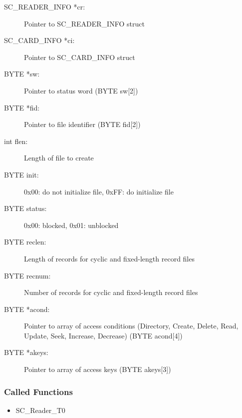 \documentclass[a4paper,oneside]{article}
\begin{document}
\begin{description}
\item[SC\_READER\_INFO *cr:] Pointer to SC\_READER\_INFO struct
\item[SC\_CARD\_INFO *ci:] Pointer to SC\_CARD\_INFO struct
\item[BYTE *sw:] Pointer to status word (BYTE sw[2])
\item[BYTE *fid:] Pointer to file identifier (BYTE fid[2])
\item[int flen:] Length of file to create
\item[BYTE init:] 0x00: do not initialize file, 0xFF: do initialize file
\item[BYTE status:] 0x00: blocked, 0x01: unblocked
\item[BYTE reclen:] Length of records for cyclic and fixed-length record files
\item[BYTE recnum:] Number of records for cyclic and fixed-length record files
\item[BYTE *acond:] Pointer to array of access conditions (Directory, Create,
   Delete, Read, Update, Seek, Increase, Decrease) (BYTE acond[4])
\item[BYTE *akeys:] Pointer to array of access keys (BYTE akeys[3])
\end{description}

\subsubsection*{Called Functions}

\begin{itemize}
\item SC\_Reader\_T0
\end{itemize}
\end{document}
